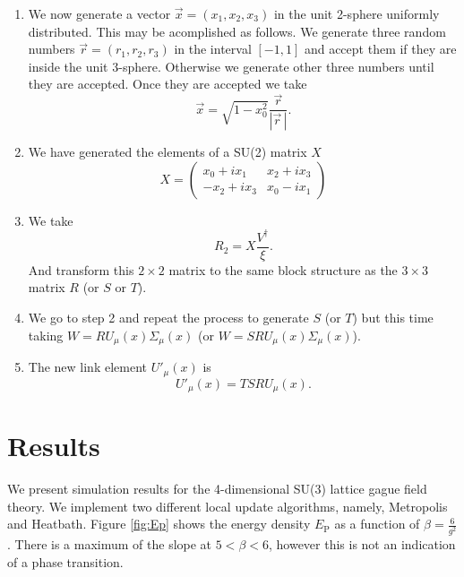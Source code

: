 \documentclass[12pt,a4paper]{article}
\begin{document}
\begin{enumerate}
	\item We now generate a vector $\vec{x} = (x_1,x_2,x_3)$ in the unit 2-sphere uniformly distributed. This may be acomplished as follows. We generate three random numbers $\vec{r} = (r_1,r_2,r_3)$ in the interval $[-1,1]$ and accept them if they are inside the unit 3-sphere. Otherwise we generate other three numbers until they are accepted. Once they are accepted we take
	\begin{equation}
		\vec{x} = \sqrt{1 - x_0^2} \frac{\vec{r}}{|\vec{r}\,|}.
	\end{equation}
	\item We have generated the elements of a SU(2) matrix $X$
	\begin{equation}
		X = \begin{pmatrix}
			x_0 + ix_1 & x_2 + ix_3 \\
		   -x_2 + ix_3 & x_0 - ix_1
		\end{pmatrix}
	\end{equation}
	\item We take
		\begin{equation}
			R_2 = X \frac{V^{\dagger}}{\xi}.
		\end{equation}
		And transform this $2\times 2$ matrix to the same block structure as the $3\times 3$ matrix $R$ (or $S$ or $T$).
		\item We go to step 2 and repeat the process to generate $S$ (or $T$) but this time taking $W = R U_{\mu}(x)\Sigma_{\mu}(x)$ (or $W = S R U_{\mu}(x)\Sigma_{\mu}(x)$).
	\item The new link element $U'_{\mu}(x)$ is
	\begin{equation}
		U'_{\mu}(x) = T S R U_{\mu}(x).
	\end{equation}			
\end{enumerate}

\section{Results}

We present simulation results for the 4-dimensional SU(3) lattice gague field theory. We implement two different local update algorithms, namely, Metropolis and Heatbath. Figure \ref{fig:Ep} shows the energy density $E_{\text{P}}$ as a function of $\beta = \frac{6}{g^2}$. There is a maximum of the slope at $5<\beta<6$, however this is not an indication of a phase transition.
\end{document}
